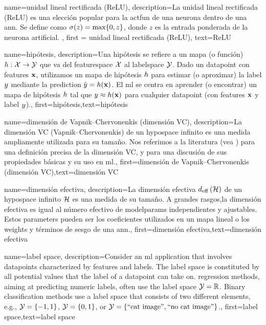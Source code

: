 {{
{name={unidad lineal rectificada (ReLU)},
	description={La unidad lineal rectificada (ReLU) es una elección popular para la 
		\gls{actfun} de una neurona dentro de una \gls{ann}. Se define como  
		$\sigma(z) = \max\{0,z\}$, donde $z$ es la entrada ponderada de la neurona artificial.
		}, 
	first = {unidad lineal rectificada (ReLU)}, text={ReLU} 
}

{name={hipótesis},
	description={Una hipótesis se refiere a un mapa (o función) $h: \mathcal{X} \rightarrow \mathcal{Y}$ que va del
		\gls{featurespace} $\mathcal{X}$ al \gls{labelspace} $\mathcal{Y}$. 
		Dado un \gls{datapoint} con \gls{feature}s ${\bf x}$, utilizamos un mapa de hipótesis $h$
		para estimar (o aproximar) la \gls{label} $y$ mediante la \gls{prediction}  
		$\hat{y} = h({\bf x})$. El \Gls{ml} se centra en aprender (o encontrar) un mapa de hipótesis 
		$h$ tal que $y \approx h({\bf x})$ 
		para cualquier \gls{datapoint} (con \gls{feature}s ${\bf x}$ y \gls{label} $y$).},
	first={hipótesis},text={hipótesis}  
}



{name={dimensión de Vapnik–Chervonenkis (dimensión VC)},
	description={La dimensión VC (Vapnik–Chervonenkis) de un \gls{hypospace} infinito es una medida ampliamente utilizada para su tamaño.
		Nos referimos a la literatura (vea \cite{ShalevMLBook}) para una definición precisa de la dimensión VC,
		y para una discusión de sus propiedades básicas y su uso en \gls{ml}.},
	first={dimensión de Vapnik–Chervonenkis (dimensión VC)},text={dimensión VC}  
}

{name={dimensión efectiva},
	description={La dimensión efectiva $d_{\rm eff} \left( \mathcal{H} \right)$ de un 
		\gls{hypospace} infinito $\mathcal{H}$ es una medida de su tamaño. A grandes rasgos,la 
		dimensión efectiva es igual al número efectivo de \gls{modelparams} independientes y ajustables. 
		Estos \gls{parameters} pueden ser los coeficientes utilizados en un mapa lineal o los 
		\gls{weights} y términos de sesgo de una \gls{ann}.},
	first={dimensión efectiva},text={dimensión efectiva}  
}

{name={label space},
	description={Consider an \gls{ml} application that involves \gls{datapoint}s characterized by \gls{feature}s 
		and \gls{label}s. The \gls{label} space is constituted by all potential values that the \gls{label} 
		of a \gls{datapoint} can take on. \Gls{regression} methods, aiming at predicting numeric \gls{label}s, often
		 use the \gls{label} space $\mathcal{Y} = \mathbb{R}$. Binary \gls{classification} methods use a \gls{label} space 
 		that consists of two different elements, e.g., $\mathcal{Y} =\{-1,1\}$, $\mathcal{Y}=\{0,1\}$, 
		or $\mathcal{Y} = \{ \mbox{``cat image''}, \mbox{``no cat image''} \}$.}, first={label space},text={label space}  
}

}}
